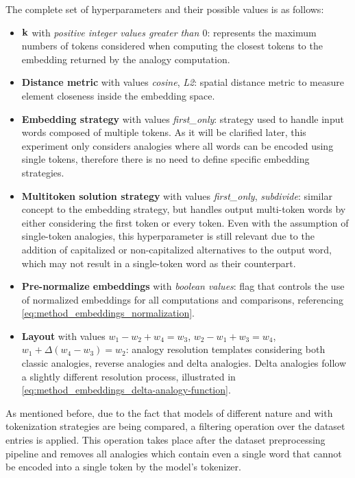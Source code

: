 The complete set of hyperparameters and their possible values is as follows:
\begin{itemize}
    \item $\bm{\mathbf{k}}$ with \emph{positive integer values greater than $0$}: represents the maximum numbers of tokens considered when computing the closest tokens to the embedding returned by the analogy computation.
    \item \textbf{Distance metric} with values \emph{cosine}, \emph{L2}: spatial distance metric to measure element closeness inside the embedding space.
    \item \textbf{Embedding strategy} with values \emph{first\_only}: strategy used to handle input words composed of multiple tokens.
As it will be clarified later, this experiment only considers analogies where all words can be encoded using single tokens, therefore there is no need to define specific embedding strategies.
    \item \textbf{Multitoken solution strategy} with values \emph{first\_only}, \emph{subdivide}: similar concept to the embedding strategy, but handles output multi-token words by either considering the first token or every token.
Even with the assumption of single-token analogies, this hyperparameter is still relevant due to the addition of capitalized or non-capitalized alternatives to the output word, which may not result in a single-token word as their counterpart.
    \item \textbf{Pre-normalize embeddings} with \emph{boolean values}: flag that controls the use of normalized embeddings for all computations and comparisons, referencing \cref{eq:method_embeddings_normalization}.
    \item \textbf{Layout} with values $w_1 - w_2 + w_4 = w_3$, $w_2 - w_1 + w_3 = w_4$, $w_1 + \Delta(w_4 - w_3) = w_2$: analogy resolution templates considering both classic analogies, reverse analogies and delta analogies.
Delta analogies follow a slightly different resolution process, illustrated in \cref{eq:method_embeddings_delta-analogy-function}.
\end{itemize}

As mentioned before, due to the fact that models of different nature and with  tokenization strategies are being compared, a filtering operation over the dataset entries is applied.
This operation takes place after the dataset preprocessing pipeline and removes all analogies which contain even a single word that cannot be encoded into a single token by the model's tokenizer.


